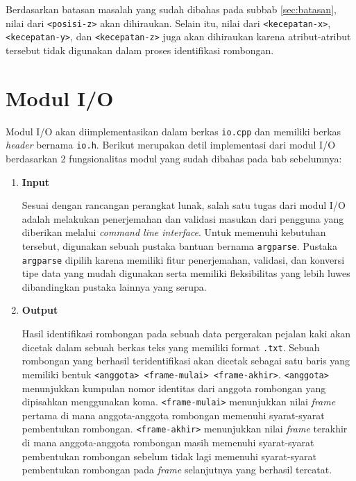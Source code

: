 Berdasarkan batasan masalah yang sudah dibahas pada subbab \ref{sec:batasan}, nilai dari \texttt{<posisi-z>} akan dihiraukan. Selain itu, nilai dari \texttt{<kecepatan-x>}, \texttt{<kecepatan-y>}, dan \texttt{<kecepatan-z>} juga akan dihiraukan karena atribut-atribut tersebut tidak digunakan dalam proses identifikasi rombongan.

\section{Modul I/O}
\label{sec:impl-io}

Modul I/O akan diimplementasikan dalam berkas \texttt{io.cpp} dan memiliki berkas \textit{header} bernama \texttt{io.h}. Berikut merupakan detil implementasi dari modul I/O berdasarkan 2 fungsionalitas modul yang sudah dibahas pada bab sebelumnya:

\begin{enumerate}
    \item \textbf{Input}
    
    Sesuai dengan rancangan perangkat lunak, salah satu tugas dari modul I/O adalah melakukan penerjemahan dan validasi masukan dari pengguna yang diberikan melalui \textit{command line interface}. Untuk memenuhi kebutuhan tersebut, digunakan sebuah pustaka bantuan bernama \texttt{argparse}. Pustaka \texttt{argparse} dipilih karena memiliki fitur penerjemahan, validasi, dan konversi tipe data yang mudah digunakan serta memiliki fleksibilitas yang lebih luwes dibandingkan pustaka lainnya yang serupa.
    
    \item \textbf{Output}
    
    Hasil identifikasi rombongan pada sebuah data pergerakan pejalan kaki akan dicetak dalam sebuah berkas teks yang memiliki format \texttt{.txt}. Sebuah rombongan yang berhasil teridentifikasi akan dicetak sebagai satu baris yang memiliki bentuk \texttt{<anggota> <frame-mulai> <frame-akhir>}. \texttt{<anggota>} menunjukkan kumpulan nomor identitas dari anggota rombongan yang dipisahkan menggunakan koma. \texttt{<frame-mulai>} menunjukkan nilai \textit{frame} pertama di mana anggota-anggota rombongan memenuhi syarat-syarat pembentukan rombongan. \texttt{<frame-akhir>} menunjukkan nilai \textit{frame} terakhir di mana anggota-anggota rombongan masih memenuhi syarat-syarat pembentukan rombongan sebelum tidak lagi memenuhi syarat-syarat pembentukan rombongan pada \textit{frame} selanjutnya yang berhasil tercatat.
\end{enumerate}

